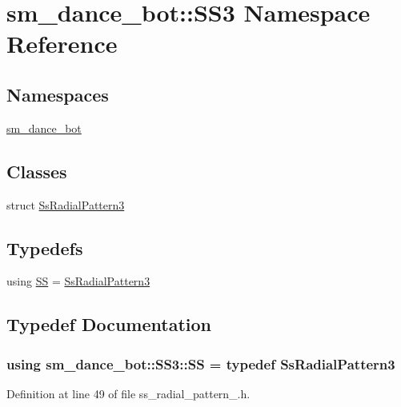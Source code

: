 \hypertarget{namespacesm__dance__bot_1_1SS3}{}\section{sm\+\_\+dance\+\_\+bot\+:\+:S\+S3 Namespace Reference}
\label{namespacesm__dance__bot_1_1SS3}
\subsection*{Namespaces}
\begin{DoxyCompactItemize}
\item 
 \hyperlink{namespacesm__dance__bot_1_1SS3_1_1sm__dance__bot}{sm\+\_\+dance\+\_\+bot}
\end{DoxyCompactItemize}
\subsection*{Classes}
\begin{DoxyCompactItemize}
\item 
struct \hyperlink{structsm__dance__bot_1_1SS3_1_1SsRadialPattern3}{Ss\+Radial\+Pattern3}
\end{DoxyCompactItemize}
\subsection*{Typedefs}
\begin{DoxyCompactItemize}
\item 
using \hyperlink{namespacesm__dance__bot_1_1SS3_aba7ea37bc21bc69fc2c374bd831c7ab1}{SS} = \hyperlink{structsm__dance__bot_1_1SS3_1_1SsRadialPattern3}{Ss\+Radial\+Pattern3}
\end{DoxyCompactItemize}


\subsection{Typedef Documentation}
\subsubsection[{\texorpdfstring{SS}{SS}}]{\setlength{\rightskip}{0pt plus 5cm}using {\bf sm\+\_\+dance\+\_\+bot\+::\+S\+S3\+::\+SS} = typedef {\bf Ss\+Radial\+Pattern3}}\hypertarget{namespacesm__dance__bot_1_1SS3_aba7ea37bc21bc69fc2c374bd831c7ab1}{}\label{namespacesm__dance__bot_1_1SS3_aba7ea37bc21bc69fc2c374bd831c7ab1}


Definition at line 49 of file ss\+\_\+radial\+\_\+pattern\+\_.\+h.

